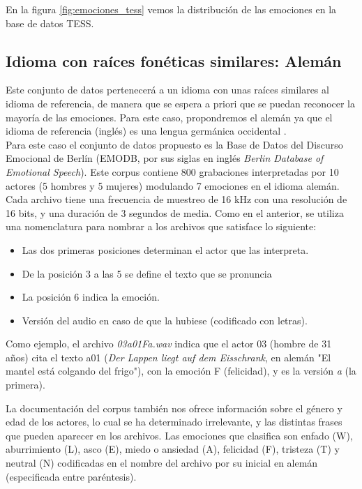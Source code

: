 \documentclass[11pt,a4paper,spanish]{book}
\begin{document}
	En la figura \ref{fig:emociones_tess} vemos la distribución de las emociones en la base de datos TESS.


	
	\subsection{Idioma con raíces fonéticas similares: Alemán} Este conjunto de datos pertenecerá a un idioma con unas raíces similares al idioma de referencia, de manera que se espera a priori que se puedan reconocer la mayoría de las emociones. Para este caso, propondremos el alemán ya que el idioma de referencia (inglés) es una lengua germánica occidental \cite{wikipediaIngles2019}.\\
	
	Para este caso el conjunto de datos propuesto es la Base de Datos del Discurso Emocional de Berlín (EMODB, por sus siglas en inglés \emph{Berlin Database of Emotional Speech}). Este corpus contiene 800 grabaciones interpretadas por 10 actores (5 hombres y 5 mujeres) modulando 7 emociones en el idioma alemán. Cada archivo tiene una frecuencia de muestreo de 16 kHz con una resolución de 16 bits, y una duración de 3 segundos de media. Como en el anterior, se utiliza una nomenclatura para nombrar a los archivos que satisface lo siguiente:
	\begin{itemize}
		\item Las dos primeras posiciones determinan el actor que las interpreta.
		\item De la posición 3 a las 5 se define el texto que se pronuncia
		\item La posición 6 indica la emoción.
		\item Versión del audio en caso de que la hubiese (codificado con letras).
	\end{itemize}

	Como ejemplo, el archivo \emph{03a01Fa.wav} indica que el actor 03 (hombre de 31 años) cita el texto a01 (\emph{Der Lappen liegt auf dem Eisschrank}, en alemán "El mantel está colgando del frigo"), con la emoción F (felicidad), y es la versión \emph{a} (la primera).
	
	La documentación del corpus también nos ofrece información sobre el género y edad de los actores, lo cual se ha determinado irrelevante, y las distintas frases que pueden aparecer en los archivos.
	Las emociones que clasifica son enfado (W), aburrimiento (L), asco (E), miedo o ansiedad (A), felicidad (F), tristeza (T) y neutral (N) codificadas en el nombre del archivo por su inicial en alemán (especificada entre paréntesis).
	
\end{document}
